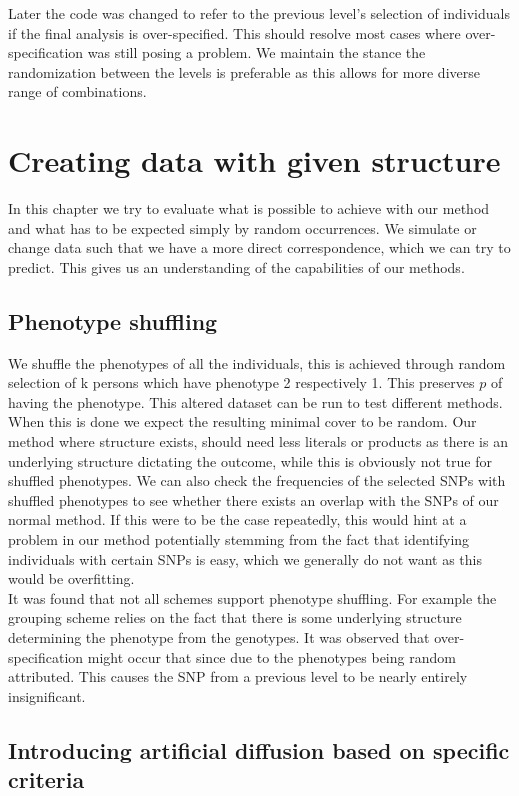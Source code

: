 \documentclass[letterpaper, 11pt]{article}
\begin{document}
Later the code was changed to refer to the previous level's selection of individuals if the final analysis is over-specified. This should resolve most cases where over-specification was still posing a problem. We maintain the stance the randomization between the levels is preferable as this allows for more diverse range of combinations.

\section{Creating data with given structure}
In this chapter we try to evaluate what is possible to achieve with our method and what has to be expected simply by random occurrences. We simulate or change data such that we have a more direct correspondence, which we can try to predict. This gives us an understanding of the capabilities of our methods.
\subsection{Phenotype shuffling}
We shuffle the phenotypes of all the individuals, this is achieved through random selection of k persons which have phenotype 2 respectively 1. This preserves $p$ of having the phenotype. 
This altered dataset can be run to test different methods. When this is done we expect the resulting minimal cover to be random. 
Our method where structure exists, should need less literals or products as there is an underlying structure dictating the outcome, while this is obviously not true for shuffled phenotypes. We can also check the frequencies of the selected SNPs with shuffled phenotypes to see whether there exists an overlap with the SNPs of our normal method. If this were to be the case repeatedly, this  would hint at a problem in our method potentially stemming from the fact that identifying individuals with certain SNPs is easy, which we generally do not want as this would be overfitting.\\
It was found that not all schemes support phenotype shuffling. For example the grouping scheme relies on the fact that there is some underlying structure determining the phenotype from the  genotypes. It was observed that over-specification might occur that since due to the phenotypes being random attributed. This causes the SNP from a previous level to be nearly entirely insignificant. \\


\subsection{Introducing artificial diffusion based on specific criteria}
\end{document}

